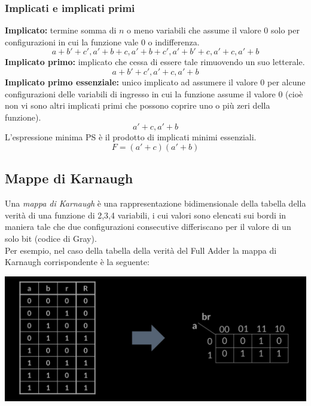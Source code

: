 \documentclass{article}
\begin{document}
\subsubsection{Implicati e implicati primi}
\textbf{Implicato:} termine somma di $n$ o meno variabili che assume il valore 0 solo per configurazioni in cui la funzione vale 0 o indifferenza.
$$ a+b'+c', a'+b+c, a'+b+c', a'+b'+c, a'+c, a'+b $$
\textbf{Implicato primo:} implicato che cessa di essere tale rimuovendo un suo letterale.
$$ a+b'+c', a'+c, a'+b $$
\textbf{Implicato primo essenziale:} unico implicato ad assumere il valore 0 per alcune configurazioni delle variabili di ingresso in cui la funzione assume il valore 0 (cioè non vi sono altri implicati primi che possono coprire uno o più zeri della funzione).
$$ a'+c, a'+b $$
L'espressione minima PS è il prodotto di implicati minimi essenziali.
$$ F = (a'+c)(a'+b) $$
\subsection{Mappe di Karnaugh}
Una \textit{mappa di Karnaugh} è una rappresentazione bidimensionale della tabella della verità di una funzione di 2,3,4 variabili, i cui valori sono elencati sui bordi in maniera tale che due configurazioni consecutive differiscano per il valore di un solo bit (codice di Gray).
\vspace{0.1cm}\\
Per esempio, nel caso della tabella della verità del Full Adder la mappa di Karnaugh corrispondente è la seguente:
\begin{center}
    \includegraphics[scale=0.53]{karnfulladd.png}
\end{center}
\end{document}
